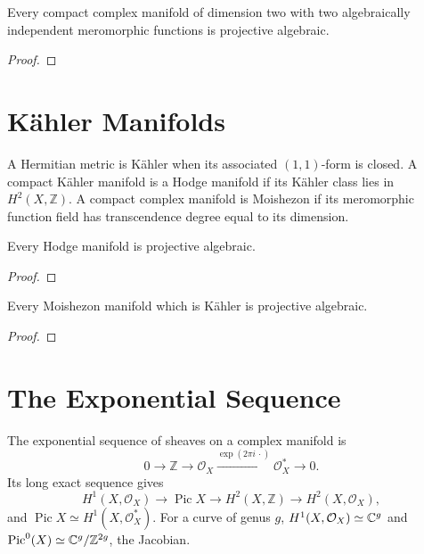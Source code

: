 \begin{theorem}
\label{ha-appB-thm3-4}
Every compact complex manifold of dimension two with two algebraically
independent meromorphic functions is projective algebraic.

\end{theorem}
\begin{proof}
\notready
\end{proof}

\section{Kähler Manifolds}
\label{ha-appB-sec4}

\begin{definition}
A Hermitian metric is Kähler when its associated $(1,1)$-form is closed.  A
compact Kähler manifold is a Hodge manifold if its Kähler class lies in
$H^2(X,\mathbb Z)$.  A compact complex manifold is Moishezon if its
meromorphic function field has transcendence degree equal to its dimension.
\end{definition}

\begin{theorem}[Kodaira]
\label{ha-appB-thm4-1}
Every Hodge manifold is projective algebraic.

\end{theorem}
\begin{proof}
\notready
\end{proof}

\begin{theorem}[Moishezon]
\label{ha-appB-thm4-2}
Every Moishezon manifold which is Kähler is projective algebraic.

\end{theorem}
\begin{proof}
\notready
\end{proof}

\section{The Exponential Sequence}
\label{ha-appB-sec5}

\begin{construction}
The exponential sequence of sheaves on a complex manifold is
\[
0\longrightarrow\mathbb Z\longrightarrow\mathcal O_X
\xrightarrow{\exp(2\pi i\,\cdot)}\mathcal O_X^*\longrightarrow0.
\]
Its long exact sequence gives
\[
H^1(X,\mathcal O_X)\to \operatorname{Pic}X
\to H^2(X,\mathbb Z)\to H^2(X,\mathcal O_X),
\]
and $\operatorname{Pic}X\simeq H^1(X,\mathcal O_X^*)$.  For a curve of genus
$g$, $H^1(X,\mathcal O_X)\simeq\mathbb C^g$ and
$\operatorname{Pic}^0(X)\simeq\mathbb C^g/\mathbb Z^{2g}$, the Jacobian.
\end{construction}
